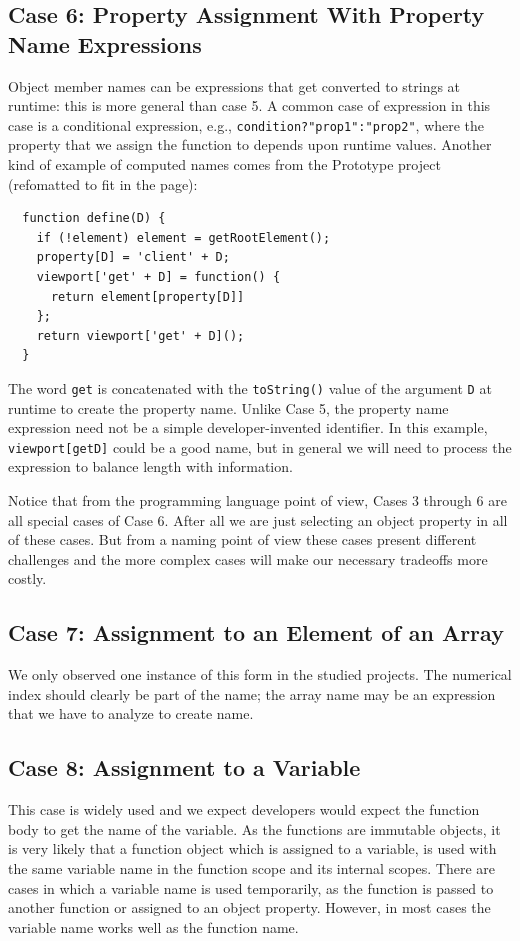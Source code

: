 \documentclass[10pt, preprint]{sigplanconf}
\begin{document}
\subsection{Case 6:  Property Assignment With  Property Name Expressions}
\label{sec:propexpressions}
Object member names can be expressions that get converted to strings at runtime: this is more general than case 5. 
 A common case of expression in this case is a conditional expression, e.g., {\small\texttt{condition?"prop1":"prop2"}}, where the property that we assign the function to depends upon runtime values. Another kind of example of computed names comes from the Prototype project (refomatted to fit in the page):
\begin{verbatim}
  function define(D) {
    if (!element) element = getRootElement();
    property[D] = 'client' + D;
    viewport['get' + D] = function() { 
      return element[property[D]] 
    };
    return viewport['get' + D]();
  }
\end{verbatim}
The word \verb|get| is concatenated with the \verb|toString()| value of the argument \verb|D| at runtime to create the property name.  Unlike Case 5, the property name expression need not be a simple developer-invented identifier. In this example, \verb|viewport[getD]| could be a good name, but in general we will need to process the expression to balance length with information.

Notice that from the programming language point of view, Cases 3 through 6 are all special cases of Case 6. After all we are just selecting an object property in all of these cases.  But from a naming point of view these cases present different challenges and the more complex cases will make our necessary tradeoffs more costly.

\subsection{Case 7: Assignment to an Element of an Array}
We only observed one instance of this form in the studied projects. The numerical index should clearly be part of the name; the array name may be an expression that we have to analyze to create name.

\subsection{Case 8: Assignment to a Variable }
This case is widely used and we expect  developers would expect the function body to get the name of the variable.
As the functions are immutable objects, it is very likely that a function object which is assigned to a variable, is used with the same variable name in the function scope
and its internal scopes. There are cases in which a variable name is used temporarily, as the function is passed to another function or assigned to an object property. However, in most cases the variable name works well as the function name. 
\end{document}
